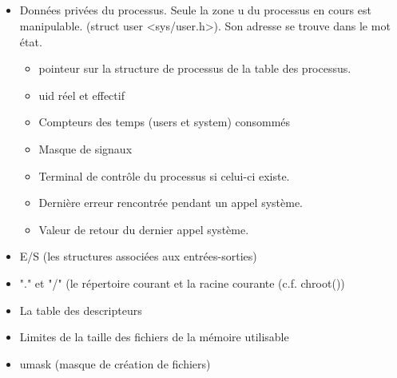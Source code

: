 \subsection{\subsectitle}
\begin{frame}{\sectitle}
\begin{block}{\subsectitle}
\begin{itemize}
\item Données privées du processus. Seule la zone u du processus en cours est
manipulable. (struct user <sys/user.h>). Son adresse se trouve dans le mot état.
\begin{itemize}
\item pointeur sur la structure de processus de la table des processus. 
\item uid réel et effectif
\item Compteurs des temps (users et system) consommés
\item Masque de signaux
\item Terminal de contrôle du processus si celui-ci existe. 
\item Dernière erreur rencontrée pendant un appel système. 
\item Valeur de retour du dernier appel système. 

\end{itemize}
\end{itemize}

\end{block}
\end{frame}


\begin{frame}{\sectitle}
\begin{block}{\subsectitle}
\begin{itemize}
\item E/S (les structures associées aux entrées-sorties)
\item "." et "/" (le répertoire courant et la racine courante (c.f. chroot()) 
\item La table des descripteurs
\item Limites de la taille des fichiers de la mémoire utilisable
\item umask (masque de création de fichiers)
\end{itemize}
\end{block}
\end{frame}





